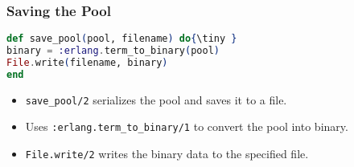 \documentclass[aspectratio=169, table]{beamer}
\begin{document}
	
	\frame{\titlepage}
	
	\begin{frame}
		\frametitle{Saving the Pool}
		\begin{lstlisting}[language=Elixir]
def save_pool(pool, filename) do{\tiny }
binary = :erlang.term_to_binary(pool)
File.write(filename, binary)
end
		\end{lstlisting}
		\begin{itemize}
			\item \texttt{save\_pool/2} serializes the pool and saves it to a file.
			\item Uses \texttt{:erlang.term\_to\_binary/1} to convert the pool into binary.
			\item \texttt{File.write/2} writes the binary data to the specified file.
		\end{itemize}
	\end{frame}
	
\end{document}
